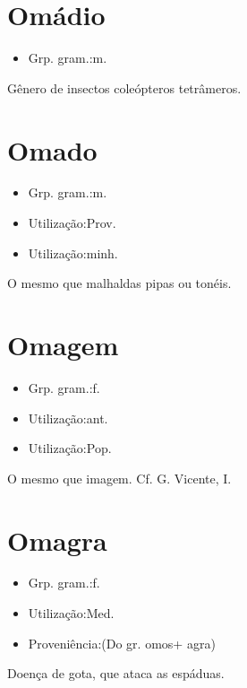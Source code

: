 \section{Omádio}
\begin{itemize}
\item {Grp. gram.:m.}
\end{itemize}
Gênero de insectos coleópteros tetrâmeros.
\section{Omado}
\begin{itemize}
\item {Grp. gram.:m.}
\end{itemize}
\begin{itemize}
\item {Utilização:Prov.}
\end{itemize}
\begin{itemize}
\item {Utilização:minh.}
\end{itemize}
O mesmo que \textunderscore malhal\textunderscore  das pipas ou tonéis.
\section{Omagem}
\begin{itemize}
\item {Grp. gram.:f.}
\end{itemize}
\begin{itemize}
\item {Utilização:ant.}
\end{itemize}
\begin{itemize}
\item {Utilização:Pop.}
\end{itemize}
O mesmo que \textunderscore imagem\textunderscore . Cf. G. Vicente, I.
\section{Omagra}
\begin{itemize}
\item {Grp. gram.:f.}
\end{itemize}
\begin{itemize}
\item {Utilização:Med.}
\end{itemize}
\begin{itemize}
\item {Proveniência:(Do gr. \textunderscore omos\textunderscore  + \textunderscore agra\textunderscore )}
\end{itemize}
Doença de gota, que ataca as espáduas.
